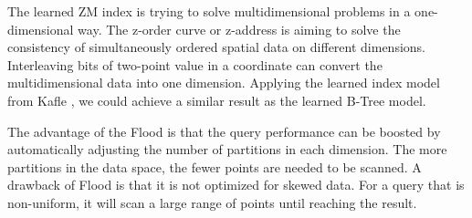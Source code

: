 The learned ZM index is trying to solve multidimensional problems in a one-dimensional way. The z-order curve or z-address is aiming to solve the consistency of simultaneously ordered spatial data on different dimensions. Interleaving bits of two-point value in a coordinate can convert the multidimensional data into one dimension. Applying the learned index model from Kafle \cite{Kafle:2017dy}, we could achieve a similar result as the learned B-Tree model. 

The advantage\cite{Ding:2020we} of the Flood is that the query performance can be boosted by automatically adjusting the number of partitions in each dimension. The more partitions in the data space, the fewer points are needed to be scanned. A drawback of Flood is that it is not optimized for skewed data. For a query that is non-uniform, it will scan a large range of points until reaching the result. 


